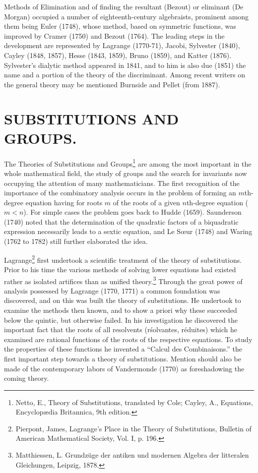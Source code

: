 \documentclass[oneside]{book}
\begin{document}
Methods of Elimination and of finding the resultant (Bezout) or
eliminant (De Morgan) occupied a number of eighteenth-century
algebraists, prominent among them being Euler (1748), whose method,
based on symmetric functions, was improved by Cramer (1750) and
Bezout (1764). The leading steps in the development are represented
by Lagrange (1770-71), Jacobi, Sylvester (1840), Cayley (1848,
1857), Hesse (1843, 1859), Bruno (1859), and Katter
(1876). Sylvester's dialytic method appeared in 1841, and to him is
also due (1851) the name and a portion of the theory of the
discriminant. Among recent writers on the general theory may be
mentioned Burnside and Pellet (from 1887).

\chapter{SUBSTITUTIONS AND GROUPS.}

The Theories of Substitutions and Groups\footnote{Netto, E., Theory
of Substitutions, translated by Cole; Cayley, A., Equations,
Encyclop\ae{}dia Britannica, 9th edition.} are among the most important
in the whole mathematical field, the study of groups and the search
for invariants now occupying the attention of many
mathematicians. The first recognition of the importance of the
combinatory analysis occurs in the problem of forming an
$m$th-degree equation having for roots $m$ of the roots of a given
$n$th-degree equation ($m < n$). For simple cases the problem goes
back to Hudde (1659). Saunderson (1740) noted that the determination
of the quadratic factors of a biquadratic expression necessarily
leads to a sextic equation, and Le S\oe{}ur (1748) and Waring (1762
to 1782) still further elaborated the idea.

Lagrange\footnote{Pierpont, James, Lagrange's Place in the Theory
of Substitutions, Bulletin of American Mathematical Society, Vol. I, p.
196.} first undertook a scientific treatment of the theory of
substitutions. Prior to his time the various methods of solving
lower equations had existed rather as isolated artifices than as
unified theory.\footnote{Matthiessen, L. Grundz\"uge der antiken
und modernen Algebra der litteralen Gleichungen, Leipzig, 1878.}
Through the great power of analysis possessed by Lagrange (1770,
1771) a common foundation was discovered, and on this was built the
theory of substitutions. He undertook to examine the methods then
known, and to show a priori why these succeeded below the quintic,
but otherwise failed. In his investigation he discovered the
important fact that the roots of all resolvents (r\'solvantes,
r\'eduites) which he examined are rational functions of the roots
of the respective equations. To study the properties of these
functions he invented a ``Calcul des Combinaisons.'' the first
important step towards a theory of substitutions. Mention should
also be made of the contemporary labors of Vandermonde (1770) as
foreshadowing the coming theory.
\end{document}
